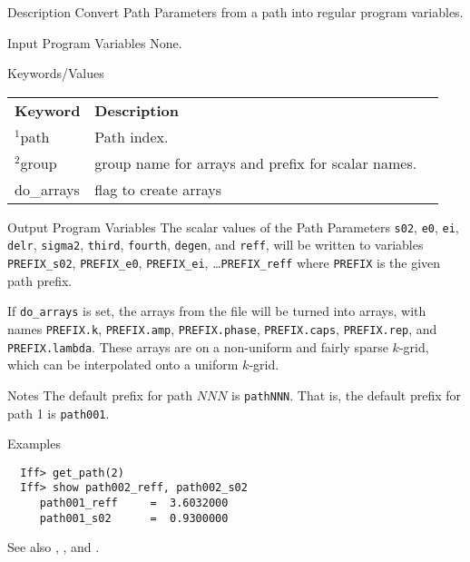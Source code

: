 \begin{IFFcom}
\item[Description] Convert Path Parameters from a {\feff} path into regular
  program  variables. 
\item[Input Program Variables] None.
\item[Keywords/Values] 
{\relax \hspace{0.25truein}\par\noindent\relax}
\begin{tabular}{lll}
  \textbf{Keyword} &   \textbf{Description}\\
  \noalign{\smallskip}
  ${}^{1}${path}  &  Path index. \\
  ${}^{2}${group} &  group name for arrays and prefix for scalar names. \\ 
  {do\_arrays}    &  flag to create arrays \\ 
\end{tabular}
\item[Output Program Variables] The scalar values of the Path Parameters
  {\tt{s02}}, {\tt{e0}}, {\tt{ei}}, {\tt{delr}}, {\tt{sigma2}},
  {\tt{third}}, {\tt{fourth}}, {\tt{degen}}, and {\tt{reff}}, will be
  written to variables {\tt{PREFIX\_s02}}, {\tt{PREFIX\_e0}},
  {\tt{PREFIX\_ei}}, \ldots {\tt{PREFIX\_reff}} where {\tt{PREFIX}} is
  the given path prefix.
  
  If {\tt{do\_arrays}} is set, the arrays from the {\feffndat} file will be
  turned into {\ifeffit} arrays, with names {\tt{PREFIX.k}},
  {\tt{PREFIX.amp}}, {\tt{PREFIX.phase}}, {\tt{PREFIX.caps}},
  {\tt{PREFIX.rep}}, and {\tt{PREFIX.lambda}}.  These arrays are on a
  non-uniform and fairly sparse $k$-grid, which can be interpolated onto a
  uniform $k$-grid.

  \item[Notes] The default prefix for path $NNN$ is {\tt{pathNNN}}. That is,
  the default prefix for path 1 is {\tt{path001}}.

\item[Examples] {\hspace{1.in} \vspace{-0.1truein} \relax }
\begin{verbatim} 
  Iff> get_path(2)
  Iff> show path002_reff, path002_s02
     path001_reff     =  3.6032000
     path001_s02      =  0.9300000
\end{verbatim}
\item[See also]  {}, {}, and   {}.
\end{IFFcom}



